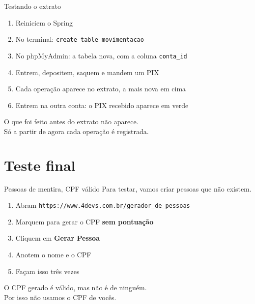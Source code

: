\documentclass[aspectratio=169,11pt]{beamer}
\begin{document}
\begin{frame}{Testando o extrato}
  \begin{enumerate}
    \item Reiniciem o Spring
    \item No terminal: \texttt{create table movimentacao}
    \item No phpMyAdmin: a tabela nova, com a coluna \texttt{conta\_id}
    \item Entrem, depositem, saquem e mandem um PIX
    \item Cada operação aparece no extrato, a mais nova em cima
    \item Entrem na outra conta: o PIX recebido aparece em verde
  \end{enumerate}

  \vspace{0.4em}
  O que foi feito antes do extrato não aparece.\\
  Só a partir de agora cada operação é registrada.
\end{frame}

\section{Teste final}

\begin{frame}{Pessoas de mentira, CPF válido}
  Para testar, vamos criar pessoas que não existem.

  \vspace{0.5em}
  \begin{enumerate}
    \item Abram \texttt{https://www.4devs.com.br/gerador\_de\_pessoas}
    \item Marquem para gerar o CPF \textbf{sem pontuação}
    \item Cliquem em \textbf{Gerar Pessoa}
    \item Anotem o nome e o CPF
    \item Façam isso três vezes
  \end{enumerate}

  \vspace{0.5em}
  O CPF gerado é válido, mas não é de ninguém.\\
  Por isso não usamos o CPF de vocês.
\end{frame}
\end{document}
